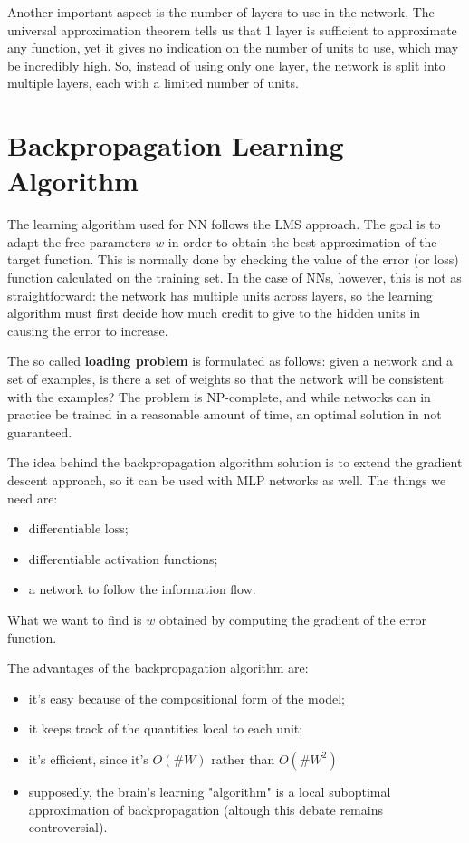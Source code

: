 Another important aspect is the number of layers to use in the network. The universal approximation theorem tells us that 1 layer is sufficient to approximate any function, yet it gives no indication on the number of units to use, which may be incredibly high. So, instead of using only one layer, the network is split into multiple layers, each with a limited number of units.

\section{Backpropagation Learning Algorithm}

The learning algorithm used for NN follows the LMS approach. The goal is to adapt the free parameters $w$ in order to obtain the best approximation of the target function. This is normally done by checking the value of the error (or loss) function calculated on the training set. In the case of NNs, however, this is not as straightforward: the network has multiple units across layers, so the learning algorithm must first decide how much credit to give to the hidden units in causing the error to increase.

The so called \textbf{loading problem} is formulated as follows: given a network and a set of examples, is there a set of weights so that the network will be consistent with the examples? The problem is NP-complete, and while networks can in practice be trained in a reasonable amount of time, an optimal solution in not guaranteed.

The idea behind the backpropagation algorithm solution is to extend the gradient descent approach, so it can be used with MLP networks as well. The things we need are:
\begin{itemize}
    \item differentiable loss;
    \item differentiable activation functions;
    \item a network to follow the information flow.
\end{itemize}
What we want to find is $w$ obtained by computing the gradient of the error function.

The advantages of the backpropagation algorithm are:
\begin{itemize}
    \item it's easy because of the compositional form of the model;
    \item it keeps track of the quantities local to each unit;
    \item it's efficient, since it's $O(\#W)$ rather than $O(\#W^2)$
    \item supposedly, the brain's learning "algorithm" is a local suboptimal approximation of backpropagation (altough this debate remains controversial).
\end{itemize}

